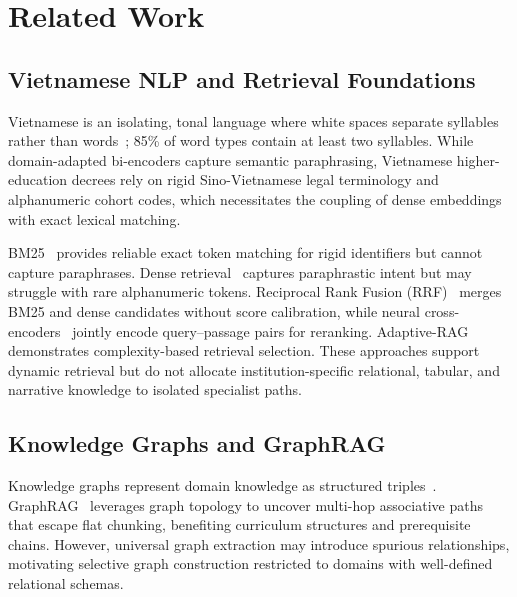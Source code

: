 \section{Related Work}
\label{sec:related}

\subsection{Vietnamese NLP and Retrieval Foundations}
\label{sec:vietnamese_nlp}

Vietnamese is an isolating, tonal language where white spaces separate syllables rather than words~\cite{nguyen2020phobert}; 85\% of word types contain at least two syllables. While domain-adapted bi-encoders capture semantic paraphrasing, Vietnamese higher-education decrees rely on rigid Sino-Vietnamese legal terminology and alphanumeric cohort codes, which necessitates the coupling of dense embeddings with exact lexical matching.

BM25~\cite{robertson2009bm25} provides reliable exact token matching for rigid identifiers but cannot capture paraphrases. Dense retrieval~\cite{karpukhin2020dpr,lewis2020rag} captures paraphrastic intent but may struggle with rare alphanumeric tokens. Reciprocal Rank Fusion (RRF)~\cite{cormack2009rrf} merges BM25 and dense candidates without score calibration, while neural cross-encoders~\cite{nogueira2019bert,xiao2023bge} jointly encode query--passage pairs for reranking. Adaptive-RAG~\cite{jeong2024adaptiverag} demonstrates complexity-based retrieval selection. These approaches support dynamic retrieval but do not allocate institution-specific relational, tabular, and narrative knowledge to isolated specialist paths.

\subsection{Knowledge Graphs and GraphRAG}
\label{sec:kg_graphrag}

Knowledge graphs represent domain knowledge as structured triples~\cite{pan2024unifying}. GraphRAG~\cite{edge2024graphrag} leverages graph topology to uncover multi-hop associative paths that escape flat chunking, benefiting curriculum structures and prerequisite chains. However, universal graph extraction may introduce spurious relationships, motivating selective graph construction restricted to domains with well-defined relational schemas.

